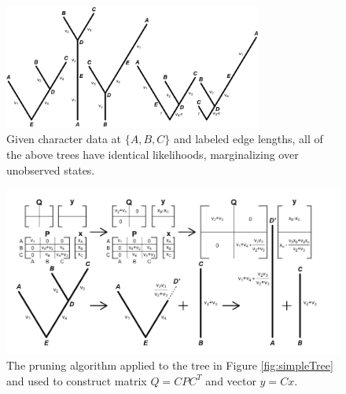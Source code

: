 \begin{figure}[th]
\centering
\includegraphics[width=85mm]{figures/identicalLikelihoods.png}
\caption[Visualizing the Pulley Principle Under mvBM]{Given character data at $\{A, B, C\}$ and labeled edge lengths, all of the above trees have identical likelihoods, marginalizing over unobserved states. \label{overflow}
\label{fig:pulleyPrinciple}
}
\end{figure}

\begin{figure}[h]
\centering
\includegraphics[width=160mm]{figures/pruningAlgorithm.png}
\caption[The Pruning Algorithm Applied to a Tree]{The pruning algorithm applied to the tree in Figure \ref{fig:simpleTree} and used to construct matrix $Q = CPC^T$ and vector $y = Cx$. 
\label{overflow}
\label{fig:pruningAlgorithm}
}
\end{figure}

